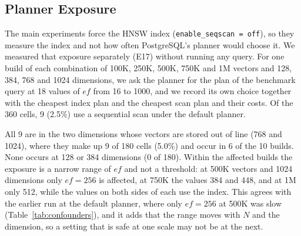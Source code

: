 \documentclass[sigconf, nonacm]{acmart}
\begin{document}
\subsection{Planner Exposure}
\label{sec:planner}

The main experiments force the HNSW index (\texttt{enable\_seqscan = off}), so they measure
the index and not how often PostgreSQL's planner would choose it. We measured that exposure
separately (E17) without running any query. For one build of each combination of 100K, 250K,
500K, 750K and 1M vectors and 128, 384, 768 and 1024 dimensions, we ask the planner for the
plan of the benchmark query at 18 values of $ef$ from 16 to 1000, and we record its own
choice together with the cheapest index plan and the cheapest scan plan and their costs. Of
the 360 cells, 9 (2.5\%) use a sequential scan under the default planner.

All 9 are in the two dimensions whose vectors are stored out of line (768 and 1024), where
they make up 9 of 180 cells (5.0\%) and occur in 6 of the 10 builds. None occurs at 128 or
384 dimensions (0 of 180). Within the affected builds the exposure is a narrow range of
$ef$ and not a threshold: at 500K vectors and 1024 dimensions only $ef=256$ is affected, at
750K the values 384 and 448, and at 1M only 512, while the values on both sides of each use
the index. This agrees with the earlier run at the default planner, where only $ef=256$ at
500K was slow (Table~\ref{tab:confounders}), and it adds that the range moves with $N$
and the dimension, so a setting that is safe at one scale may not be at the next.
\end{document}
